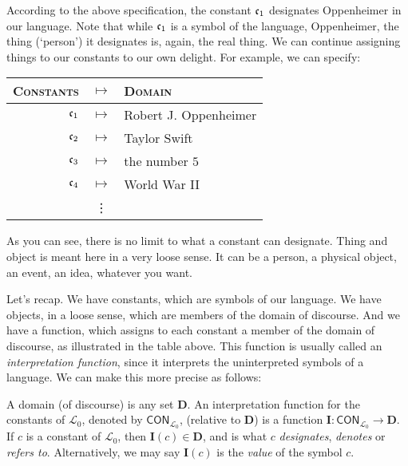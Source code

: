 According to the above specification, the constant $\mathfrak{c}_{1}$ designates Oppenheimer in our language. Note that while $\mathfrak{c}_{1}$ is a symbol of the language, Oppenheimer, the thing (`person') it designates is, again, the real thing. We can continue assigning things to our constants to our own delight. For example, we can specify:
\begin{center}
	\begin{tabular}{rcl}
		\textsc{Constants} & $\mapsto$ & \textsc{Domain}\\\hline
		$\mathfrak{c}_{1}$ & $\mapsto$ & Robert J. Oppenheimer\\
		$\mathfrak{c}_{2}$ & $\mapsto$ & Taylor Swift\\
		$\mathfrak{c}_{3}$ & $\mapsto$ & the number $5$\\
		$\mathfrak{c}_{4}$ & $\mapsto$ & World War II\\
		& \vdots & 
	\end{tabular}
\end{center}

As you can see, there is no limit to what a constant can designate. Thing and object is meant here in a very loose sense. It can be a person, a physical object, an event, an idea, whatever you want. 

Let's recap. We have constants, which are symbols of our language. We have objects, in a loose sense, which are members of the domain of discourse. And we have a function, which assigns to each constant a member of the domain of discourse, as illustrated in the table above. This function is usually called an \textit{interpretation function}, since it interprets the uninterpreted symbols of a language. We can make this more precise as follows:

\begin{defn}
A domain (of discourse) is any set $\mathbf{D}$. An interpretation function for the constants of $\mathcal{L}_0$, denoted by $\mathsf{CON}_{\mathcal{L}_0}$, (relative to $\mathbf{D}$) is a function $\mathbf{I}: \mathsf{CON}_{\mathcal{L}_0} \to \mathbf{D}$. If $c$ is a constant of $\mathcal{L}_0$, then $\mathbf{I}(c) \in \mathbf{D}$, and is what $c$ \textit{designates}, \textit{denotes} or \textit{refers to}. Alternatively, we may say $\mathbf{I}(c)$ is the \textit{value} of the symbol $c$. 
\end{defn}


